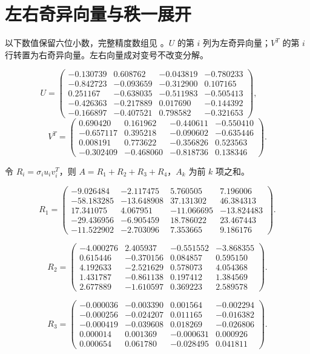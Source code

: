 \documentclass[UTF8,a4paper,11pt,fontset=fandol]{ctexart}
\begin{document}
\section{左右奇异向量与秩一展开}
以下数值保留六位小数，完整精度数组见 。$U$ 的第 $i$ 列为左奇异向量；$V^T$ 的第 $i$ 行转置为右奇异向量。左右向量成对变号不改变分解。


\[U=\begin{pmatrix}-0.130739 & 0.608762 & -0.043819 & -0.780233\\-0.842723 & -0.093659 & -0.312900 & 0.107165\\0.251167 & -0.638035 & -0.511983 & -0.505413\\-0.426363 & -0.217889 & 0.017690 & -0.144392\\-0.166897 & -0.407521 & 0.798582 & -0.321653\end{pmatrix},\qquad\]\[V^T=\begin{pmatrix}0.690420 & 0.161962 & -0.440611 & -0.550410\\-0.657117 & 0.395218 & -0.090602 & -0.635446\\0.008191 & 0.773622 & -0.356826 & 0.523563\\-0.302409 & -0.468060 & -0.818736 & 0.138346\end{pmatrix}.\]

令 $R_i=\sigma_i u_iv_i^T$，则 $A=R_1+R_2+R_3+R_4$，$A_k$ 为前 $k$ 项之和。

\[R_1=\begin{pmatrix}-9.026484 & -2.117475 & 5.760505 & 7.196006\\-58.183285 & -13.648908 & 37.131302 & 46.384313\\17.341075 & 4.067951 & -11.066695 & -13.824483\\-29.436956 & -6.905459 & 18.786022 & 23.467443\\-11.522902 & -2.703096 & 7.353665 & 9.186176\end{pmatrix}.\]

\[R_2=\begin{pmatrix}-4.000276 & 2.405937 & -0.551552 & -3.868355\\0.615446 & -0.370156 & 0.084857 & 0.595150\\4.192633 & -2.521629 & 0.578073 & 4.054368\\1.431787 & -0.861138 & 0.197412 & 1.384569\\2.677889 & -1.610597 & 0.369223 & 2.589578\end{pmatrix}.\]

\[R_3=\begin{pmatrix}-0.000036 & -0.003390 & 0.001564 & -0.002294\\-0.000256 & -0.024207 & 0.011165 & -0.016382\\-0.000419 & -0.039608 & 0.018269 & -0.026806\\0.000014 & 0.001369 & -0.000631 & 0.000926\\0.000654 & 0.061780 & -0.028495 & 0.041811\end{pmatrix}.\]
\end{document}
